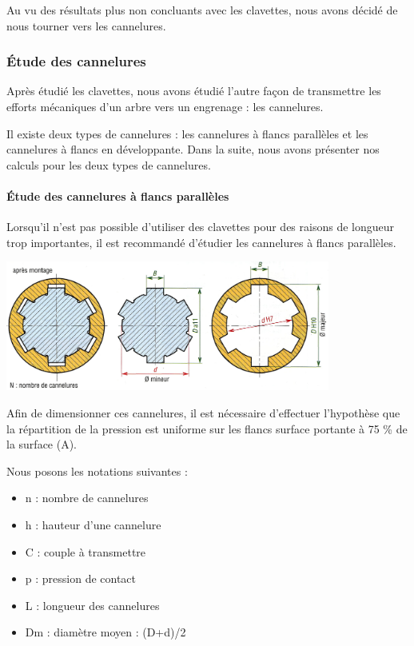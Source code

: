 \documentclass{config}
\begin{document}
\begin{spacing}{1.2}
Au vu des résultats plus non concluants avec les clavettes, nous avons décidé de nous tourner vers les cannelures.

\subsubsection{Étude des cannelures}
Après étudié les clavettes, nous avons étudié l'autre façon de transmettre les efforts mécaniques d'un arbre vers un engrenage : les cannelures.

Il existe deux types de cannelures : les cannelures à flancs parallèles et les cannelures à flancs en développante.
Dans la suite, nous avons présenter nos calculs pour les deux types de cannelures.

\paragraph{Étude des cannelures à flancs parallèles \\}

Lorsqu'il n'est pas possible d'utiliser des clavettes pour des raisons de longueur trop importantes, il est recommandé d'étudier les cannelures à flancs parallèles.

\begin{center}
\includegraphics[width=0.8\textwidth]{cannelure_parallele.jpg}
\end{center}

Afin de dimensionner ces cannelures, il est nécessaire d'effectuer l'hypothèse que la répartition de la pression est uniforme sur les flancs surface portante à 75 \% de la surface (A).

Nous posons les notations suivantes :
\begin{itemize}
\item n : nombre de cannelures
\item h : hauteur d'une cannelure
\item C : couple à transmettre
\item p : pression de contact
\item L : longueur des cannelures
\item Dm : diamètre moyen : (D+d)/2
\end{itemize}


\end{spacing}
\end{document}
